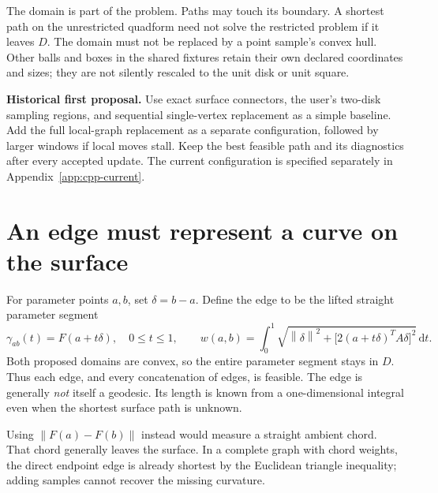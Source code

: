 \documentclass[11pt,letterpaper]{article}
\newcommand{\norm}[1]{\left\lVert#1\right\rVert}
\newcommand{\dd}{\,\mathrm{d}}
\begin{document}
The domain is part of the problem. Paths may touch its boundary. A shortest path on the unrestricted quadform need not solve the restricted problem if it leaves $D$. The domain must not be replaced by a point sample's convex hull. Other balls and boxes in the shared fixtures retain their own declared coordinates and sizes; they are not silently rescaled to the unit disk or unit square.

\textbf{Historical first proposal.} Use exact surface connectors, the user's two-disk sampling regions, and sequential single-vertex replacement as a simple baseline. Add the full local-graph replacement as a separate configuration, followed by larger windows if local moves stall. Keep the best feasible path and its diagnostics after every accepted update. The current configuration is specified separately in Appendix~\ref{app:cpp-current}.

\clearpage
\section{An edge must represent a curve on the surface}
For parameter points $a,b$, set $\delta=b-a$. Define the edge to be the lifted straight parameter segment
\begin{equation}\label{eq:connector}
 \gamma_{ab}(t)=F(a+t\delta),\quad 0\le t\le1,
 \qquad w(a,b)=\int_0^1\sqrt{\norm{\delta}^2+
 \bigl[2(a+t\delta)^TA\delta\bigr]^2}\dd t.
\end{equation}
Both proposed domains are convex, so the entire parameter segment stays in $D$. Thus each edge, and every concatenation of edges, is feasible. The edge is generally \emph{not} itself a geodesic. Its length is known from a one-dimensional integral even when the shortest surface path is unknown.

Using $\norm{F(a)-F(b)}$ instead would measure a straight ambient chord. That chord generally leaves the surface. In a complete graph with chord weights, the direct endpoint edge is already shortest by the Euclidean triangle inequality; adding samples cannot recover the missing curvature.
\end{document}
